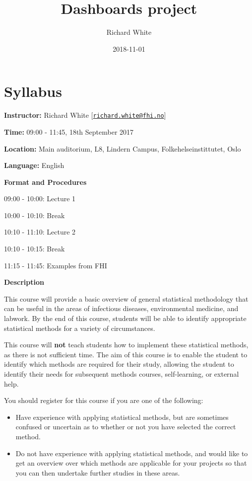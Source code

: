 \documentclass[12pt,]{article}
\title{Dashboards project}
\author{Richard White}
\date{2018-11-01}
\providecommand{\tightlist}{%
  \setlength{\itemsep}{0pt}\setlength{\parskip}{0pt}}
\begin{document}
\maketitle

{
\hypersetup{linkcolor=black}
\setcounter{tocdepth}{2}
\tableofcontents
}
\listoftables
\listoffigures
\section*{Syllabus}\label{syllabus}

\textbf{Instructor:} Richard White
{[}\href{mailto:richard.white@fhi.no}{\nolinkurl{richard.white@fhi.no}}{]}

\textbf{Time:} 09:00 - 11:45, 18th September 2017

\textbf{Location:} Main auditorium, L8, Lindern Campus,
Folkehelseinstittutet, Oslo

\textbf{Language:} English

\textbf{Format and Procedures}

09:00 - 10:00: Lecture 1

10:00 - 10:10: Break

10:10 - 11:10: Lecture 2

10:10 - 10:15: Break

11:15 - 11:45: Examples from FHI

\textbf{Description}

This course will provide a basic overview of general statistical
methodology that can be useful in the areas of infectious diseases,
environmental medicine, and labwork. By the end of this course, students
will be able to identify appropriate statistical methods for a variety
of circumstances.

This course will \textbf{not} teach students how to implement these
statistical methods, as there is not sufficient time. The aim of this
course is to enable the student to identify which methods are required
for their study, allowing the student to identify their needs for
subsequent methods courses, self-learning, or external help.

You should register for this course if you are one of the following:

\begin{itemize}
\tightlist
\item
  Have experience with applying statistical methods, but are sometimes
  confused or uncertain as to whether or not you have selected the
  correct method.
\item
  Do not have experience with applying statistical methods, and would
  like to get an overview over which methods are applicable for your
  projects so that you can then undertake further studies in these
  areas.
\end{itemize}
\end{document}
